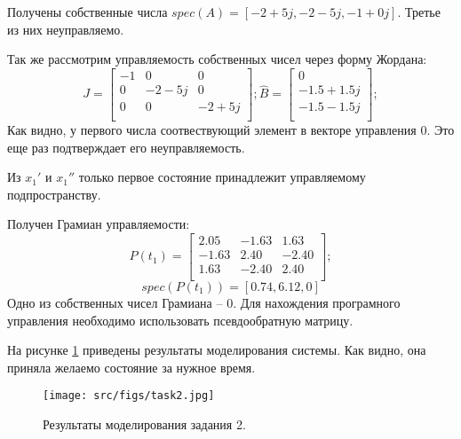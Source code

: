 Получены собственные числа \(spec(A) = [-2+5j, -2 -5j, -1+0j]\). Третье из них неуправляемо.

Так же рассмотрим управляемость собственных чисел через форму Жордана:
\[
        J = \begin{bmatrix}
                -1 & 0 & 0 \\
                0 & -2 - 5j & 0 \\
                0 & 0 & -2 + 5j \\
                \end{bmatrix};
        \hat{B} = \begin{bmatrix}
                0 \\
                -1.5 + 1.5j \\
                -1.5 - 1.5j \\
                \end{bmatrix};
\]
Как видно, у первого числа соотвествующий элемент в векторе управления 0. Это еще раз подтверждает его неуправляемость.

Из \(x_1'\) и \(x_1''\) только первое состояние принадлежит управляемому подпространству.

Получен Грамиан управляемости:
\[
        P(t_1) = \begin{bmatrix}
        2.05 & -1.63 & 1.63 \\
        -1.63 & 2.40 & -2.40 \\
        1.63 & -2.40 & 2.40 \\
        \end{bmatrix};
\]
\[
        spec(P(t_1)) = [0.74,  6.12, 0]
\]
Одно из собственных чисел Грамиана -- 0. Для нахождения програмного управления необходимо использовать псевдообратную матрицу.

На рисунке \ref{fig:task2} приведены результаты моделирования системы. Как видно, она приняла желаемо состояние за нужное время.
\begin{figure}[ht!]
        \centering
        \texttt{[image: src/figs/task2.jpg]}
        \caption{Результаты моделирования задания 2.}
        \label{fig:task2}
\end{figure}


